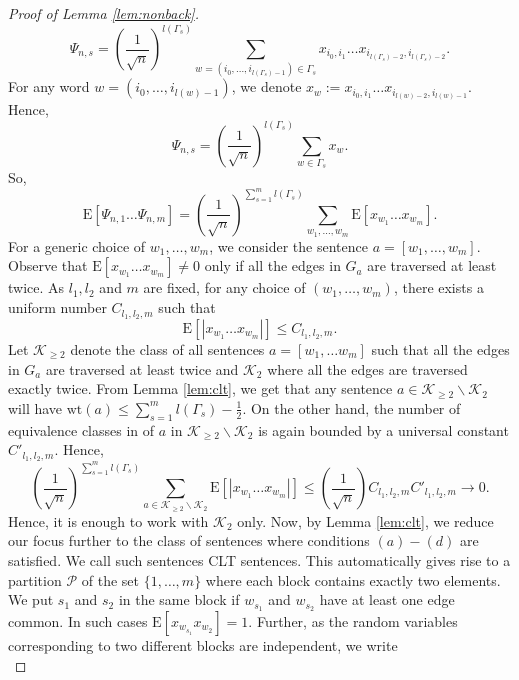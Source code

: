 \documentclass[reqno,12pt]{amsart}
\theoremstyle{plain}
\theoremstyle{definition}
\begin{document}
\begin{proof}[Proof of Lemma \ref{lem:nonback}]
\[
\Psi_{n,s}= \left( \frac{1}{\sqrt{n}} \right)^{l(\Gamma_{s})} \sum_{w=(i_{0},\ldots,i_{l(\Gamma_{s})-1}) \in \Gamma_{s} } x_{i_{0},i_{1}}\ldots x_{i_{l(\Gamma_{s})-2},i_{l(\Gamma_{s})-2}}.
\]
For any word $w=(i_{0},\ldots,i_{l(w)-1})$, we denote 
$x_{w}:= x_{i_{0},i_{1}}\ldots x_{i_{l(w)-2},i_{l(w)-1}}$.
Hence,
\[
\Psi_{n,s}= \left( \frac{1}{\sqrt{n}} \right)^{l(\Gamma_{s})} \sum_{w \in \Gamma_{s}} x_{w}.
\]
So, 
\[
\mathrm{E}[\Psi_{n,1}\ldots \Psi_{n,m}]= \left( \frac{1}{\sqrt{n}} \right)^{\sum_{s=1}^{m}l(\Gamma_{s})} \sum_{w_{1},\ldots, w_{m}} \mathrm{E}\left[x_{w_{1}}\ldots x_{w_{m}}\right].
\]
For a generic choice of $w_{1},\ldots, w_{m}$, we consider the sentence $a=[w_{1},\ldots, w_{m}]$. Observe that $\mathrm{E}[x_{w_{1}}\ldots x_{w_{m}}] \neq 0$ only if all the edges in $G_{a}$ are traversed at least twice. As $l_{1},l_{2}$ and $m$ are fixed, for any choice of $(w_{1},\ldots,w_{m})$, there exists a uniform number $C_{l_{1},l_{2},m}$ such that 
\[
\mathrm{E}\left[ \left| x_{w_{1}}\ldots x_{w_{m}} \right| \right] \le C_{l_{1},l_{2},m}.
\]
Let $\mathcal{K}_{\ge 2}$ denote the class of all sentences $a=[w_{1},\ldots w_{m}]$ such that all the edges in $G_{a}$ are traversed at least twice and $\mathcal{K}_{2}$ where all the edges are traversed exactly twice. From Lemma \ref{lem:clt}, we get that any sentence $a \in \mathcal{K}_{\ge 2} \backslash \mathcal{K}_{2}$ will have $\mathrm{wt}(a)\le \sum_{s=1}^{m} l(\Gamma_{s}) -\frac{1}{2}$. On the other hand, the number of equivalence classes in of $a$ in $\mathcal{K}_{\ge 2}\backslash \mathcal{K}_{2}$ is again bounded by a universal constant $C'_{l_{1},l_{2},m}$. Hence,
\[
\left( \frac{1}{\sqrt{n}} \right)^{\sum_{s=1}^{m}l(\Gamma_{s})}\sum_{a \in \mathcal{K}_{\ge 2}\backslash \mathcal{K}_{2}} \mathrm{E}\left[\left| x_{w_{1}}\ldots x_{w_{m}} \right|\right] \le \left( \frac{1}{\sqrt{n}} \right) C_{l_{1},l_{2},m} C'_{l_{1},l_{2},m} \to 0.
\]
Hence, it is enough to work with $\mathcal{K}_{2}$ only. Now, by Lemma \ref{lem:clt}, we reduce our focus further to the class of sentences where conditions $(a)-(d)$ are satisfied. We call such sentences CLT sentences. This automatically gives rise to a partition $\mathcal{P}$ of the set $\{ 1,\ldots, m \}$ where each block contains exactly two elements. We put $s_{1}$ and $s_{2}$ in the same block if $w_{s_{1}}$ and $w_{s_{2}}$ have at least one edge common. In such cases $\mathrm{E}[x_{w_{s_{1}}}x_{w_{2}}]=1.$
Further, as the random variables corresponding to two different blocks are independent, we write 
\begin{equation}\label{eq:wicks}

\end{equation}
\end{proof}
\end{document}
